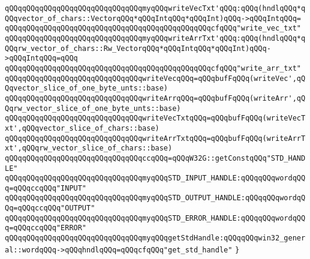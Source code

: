 \newline
\verb|qQQqqQQqqQQqqQQqqQQqqQQqqQQqqQQqmyqQQqwriteVecTxt'qQQq:qQQq(hndlqQQq*qQQqvector_of_chars::VectorqQQq*qQQqIntqQQq*qQQqInt)qQQq->qQQqIntqQQq=|\newline
\verb|qQQqqQQqqQQqqQQqqQQqqQQqqQQqqQQqqQQqqQQqqQQqqQQqcfqQQq"write_vec_txt"|\newline
\verb|qQQqqQQqqQQqqQQqqQQqqQQqqQQqqQQqmyqQQqwriteArrTxt'qQQq:qQQq(hndlqQQq*qQQqrw_vector_of_chars::Rw_VectorqQQq*qQQqIntqQQq*qQQqInt)qQQq->qQQqIntqQQq=qQQq|\newline
\verb|qQQqqQQqqQQqqQQqqQQqqQQqqQQqqQQqqQQqqQQqqQQqqQQqcfqQQq"write_arr_txt"|\newline
\newline
\verb|qQQqqQQqqQQqqQQqqQQqqQQqqQQqqQQqwriteVecqQQq=qQQqbufFqQQq(writeVec',qQQqvector_slice_of_one_byte_unts::base)|\newline
\verb|qQQqqQQqqQQqqQQqqQQqqQQqqQQqqQQqwriteArrqQQq=qQQqbufFqQQq(writeArr',qQQqrw_vector_slice_of_one_byte_unts::base)|\newline
\verb|qQQqqQQqqQQqqQQqqQQqqQQqqQQqqQQqwriteVecTxtqQQq=qQQqbufFqQQq(writeVecTxt',qQQqvector_slice_of_chars::base)|\newline
\verb|qQQqqQQqqQQqqQQqqQQqqQQqqQQqqQQqwriteArrTxtqQQq=qQQqbufFqQQq(writeArrTxt',qQQqrw_vector_slice_of_chars::base)|\newline
\newline
\verb|qQQqqQQqqQQqqQQqqQQqqQQqqQQqqQQqccqQQq=qQQqW32G::getConstqQQq"STD_HANDLE"|\newline
\verb|qQQqqQQqqQQqqQQqqQQqqQQqqQQqqQQqmyqQQqSTD_INPUT_HANDLE:qQQqqQQqwordqQQq=qQQqccqQQq"INPUT"|\newline
\verb|qQQqqQQqqQQqqQQqqQQqqQQqqQQqqQQqmyqQQqSTD_OUTPUT_HANDLE:qQQqqQQqwordqQQq=qQQqccqQQq"OUTPUT"|\newline
\verb|qQQqqQQqqQQqqQQqqQQqqQQqqQQqqQQqmyqQQqSTD_ERROR_HANDLE:qQQqqQQqwordqQQq=qQQqccqQQq"ERROR"|\newline
\newline
\verb|qQQqqQQqqQQqqQQqqQQqqQQqqQQqqQQqmyqQQqgetStdHandle:qQQqqQQqwin32_general::wordqQQq->qQQqhndlqQQq=qQQqcfqQQq"get_std_handle"|\newline
\verb|}|\newline
\newline
\newline

